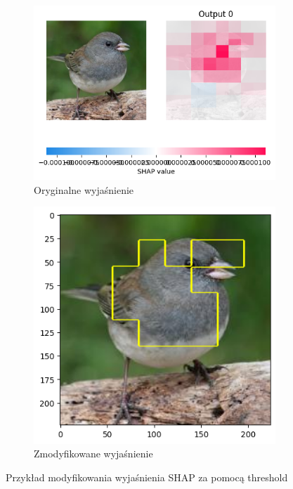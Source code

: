\begin{figure}[h]
	\centering
	\begin{subfigure}[b]{0.45\textwidth}
		\includegraphics[width=.9\textwidth]{img/parameters/shap/threshold_base}
		\caption{Oryginalne wyjaśnienie}  \label{rys:parameters_lime_numsamples_5}
	\end{subfigure}
	\begin{subfigure}[b]{0.45\textwidth}
		\centering\includegraphics[width=.9\textwidth]{img/parameters/shap/threshold_mean}
		\caption{Zmodyfikowane wyjaśnienie}  \label{rys:parameters_lime_numsamples_1000}
	\end{subfigure}
	\caption{Przykład modyfikowania wyjaśnienia SHAP za pomocą threshold}
\end{figure}

